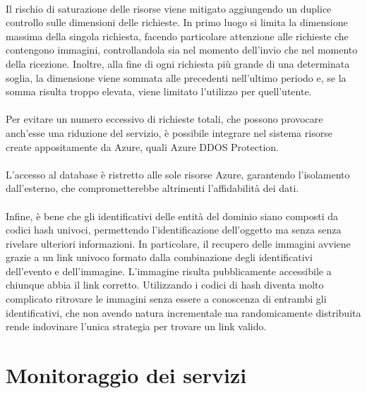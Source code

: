 \\
Il rischio di saturazione delle risorse viene mitigato
aggiungendo un duplice controllo sulle dimensioni delle richieste.
In primo luogo si limita la dimensione massima della singola richiesta,
facendo particolare attenzione alle richieste che contengono immagini,
controllandola sia nel momento dell'invio che nel momento della ricezione.
Inoltre, alla fine di ogni richiesta più grande di una determinata soglia,
la dimensione viene sommata alle precedenti nell'ultimo periodo e,
se la somma risulta troppo elevata, viene limitato l'utilizzo per quell'utente.\\
\\
Per evitare un numero eccessivo di richieste totali,
che possono provocare anch'esse una riduzione del servizio,
è possibile integrare nel sistema risorse create appositamente da Azure,
quali Azure DDOS Protection.\\
\\
L'accesso al database è ristretto alle sole risorse Azure,
garantendo l'isolamento dall'esterno,
che comprometterebbe altrimenti l'affidabilità dei dati.\\
\\
Infine, è bene che gli identificativi delle entità del dominio 
siano composti da codici hash univoci, 
permettendo l'identificazione dell'oggetto ma senza senza rivelare ulteriori informazioni.
In particolare, il recupero delle immagini
avviene grazie a un link univoco formato dalla combinazione
degli identificativi dell'evento e dell'immagine.
L'immagine risulta pubblicamente accessibile a chiunque abbia il link corretto.
Utilizzando i codici di hash diventa molto complicato ritrovare le immagini
senza essere a conoscenza di entrambi gli identificativi,
che non avendo natura incrementale ma randomicamente distribuita rende
indovinare l'unica strategia per trovare un link valido.

\section{Monitoraggio dei servizi}

